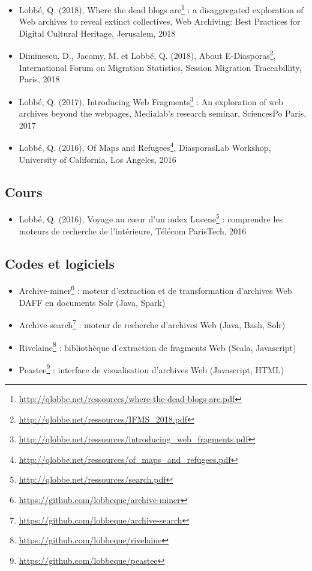 \documentclass[symmetric,justified,marginals=raggedouter]{tufte-book}
\begin{document}
\begin{itemize}[leftmargin=*] 
\item Lobbé, Q. (2018), Where the dead blogs are\footnote{\RaggedOuter \url{http://qlobbe.net/ressources/where-the-dead-blogs-are.pdf}} : a disaggregated exploration of Web archives to reveal extinct collectives, Web Archiving: Best Practices for Digital Cultural Heritage, Jerusalem, 2018 
\item Diminescu, D., Jacomy, M. et Lobbé, Q. (2018), About E-Diasporas\footnote{\RaggedOuter \url{http://qlobbe.net/ressources/IFMS\_2018.pdf}}, International Forum on Migration Statistics, Session Migration Traceabillity, Paris, 2018
\item Lobbé, Q. (2017), Introducing Web Fragments\footnote{\RaggedOuter \url{http://qlobbe.net/ressources/introducing\_web\_fragments.pdf}} : An exploration of web archives beyond the webpages, Medialab’s research seminar, SciencesPo Paris, 2017
\item Lobbé, Q. (2016), Of Maps and Refugees\footnote{\RaggedOuter \url{http://qlobbe.net/ressources/of\_maps\_and\_refugees.pdf}}, DiasporasLab Workshop, University of California, Los Angeles, 2016
\end{itemize}

\subsection{Cours}

\begin{itemize}[leftmargin=*] 
\item Lobbé, Q. (2016), Voyage au cœur d'un index Lucene\footnote{\RaggedOuter \url{http://qlobbe.net/ressources/search.pdf}} : comprendre les moteurs de recherche de l'intérieure, Télécom ParisTech, 2016
\end{itemize}

\subsection{Codes et logiciels}

\begin{itemize}[leftmargin=*] 
\item Archive-miner\footnote{\RaggedOuter \url{https://github.com/lobbeque/archive-miner}} : moteur d'extraction et de transformation d'archives Web DAFF en documents Solr (Java, Spark) 
\item Archive-search\footnote{\RaggedOuter \url{https://github.com/lobbeque/archive-search}} : moteur de recherche d'archives Web (Java, Bash, Solr) 
\item Rivelaine\footnote{\RaggedOuter \url{https://github.com/lobbeque/rivelaine}} : bibliothèque d'extraction de fragments Web (Scala, Javascript)
\item Peastee\footnote{\RaggedOuter \url{https://github.com/lobbeque/peastee}} : interface de visualisation d'archives Web (Javascript, HTML) 
\end{itemize}
\end{document}
